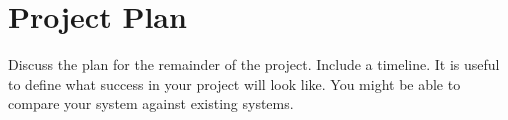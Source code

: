 \chapter{Project Plan}

Discuss the plan for the remainder of the project. Include a timeline.
It is useful to define what success in your project will look like. You might be able to compare your system against existing systems.
